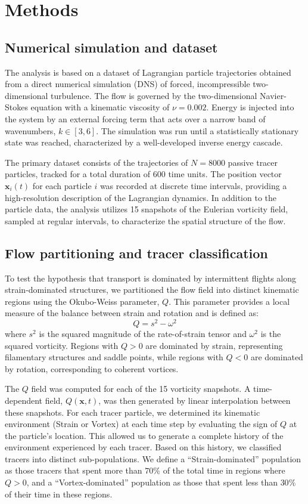 \documentclass[]{article}
\begin{document}
\section{Methods}
\label{sec:methods}
\subsection{Numerical simulation and dataset}
The analysis is based on a dataset of Lagrangian particle trajectories obtained from a direct numerical simulation (DNS) of forced, incompressible two-dimensional turbulence. The flow is governed by the two-dimensional Navier-Stokes equation with a kinematic viscosity of $\nu = 0.002$. Energy is injected into the system by an external forcing term that acts over a narrow band of wavenumbers, $k \in [3, 6]$. The simulation was run until a statistically stationary state was reached, characterized by a well-developed inverse energy cascade.

The primary dataset consists of the trajectories of $N=8000$ passive tracer particles, tracked for a total duration of $600$ time units. The position vector $\mathbf{x}_i(t)$ for each particle $i$ was recorded at discrete time intervals, providing a high-resolution description of the Lagrangian dynamics. In addition to the particle data, the analysis utilizes 15 snapshots of the Eulerian vorticity field, sampled at regular intervals, to characterize the spatial structure of the flow.

\subsection{Flow partitioning and tracer classification}
To test the hypothesis that transport is dominated by intermittent flights along strain-dominated structures, we partitioned the flow field into distinct kinematic regions using the Okubo-Weiss parameter, $Q$. This parameter provides a local measure of the balance between strain and rotation and is defined as:
\begin{equation}
Q = s^2 - \omega^2
\end{equation}
where $s^2$ is the squared magnitude of the rate-of-strain tensor and $\omega^2$ is the squared vorticity. Regions with $Q > 0$ are dominated by strain, representing filamentary structures and saddle points, while regions with $Q < 0$ are dominated by rotation, corresponding to coherent vortices.

The $Q$ field was computed for each of the 15 vorticity snapshots. A time-dependent field, $Q(\mathbf{x}, t)$, was then generated by linear interpolation between these snapshots. For each tracer particle, we determined its kinematic environment (Strain or Vortex) at each time step by evaluating the sign of $Q$ at the particle's location. This allowed us to generate a complete history of the environment experienced by each tracer. Based on this history, we classified tracers into distinct sub-populations. We define a ``Strain-dominated'' population as those tracers that spent more than $70\%$ of the total time in regions where $Q>0$, and a ``Vortex-dominated'' population as those that spent less than $30\%$ of their time in these regions.
\end{document}
